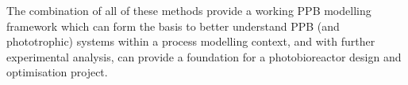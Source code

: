 The combination of all of these methods provide a working PPB modelling framework which can form the basis to better understand PPB (and phototrophic) systems within a process modelling context, and with further experimental analysis, can provide a foundation for a photobioreactor design and optimisation project. 


%